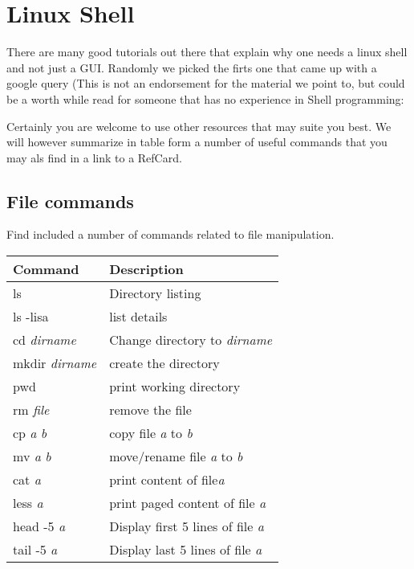 

\chapter{Linux Shell}
\label{C:linux-shell}

\FILENAME

There are many good tutorials out there that explain why one needs a
linux shell and not just a GUI. Randomly we picked the firts one that
came up with a google query (This is not an endorsement for the material
we point to, but could be a worth while read for someone that has no
experience in Shell programming:


Certainly you are welcome to use other resources that may suite you
best. We will however summarize in table form a number of useful
commands that you may als find in a link to a RefCard.



\section{File commands}\label{file-commands}

Find included a number of commands related to file manipulation.

\begin{tabular}{ll}
Command & Description \\
\hline
ls & Directory listing\\
ls -lisa & list details \\
cd \emph{dirname} & Change directory to \emph{dirname} \\
mkdir \emph{dirname} & create the directory \\
pwd & print working directory \\
rm \emph{file} & remove the file \\
cp \emph{a} \emph{b} & copy file \emph{a} to \emph{b} \\
mv \emph{a} \emph{b} & move/rename file \emph{a} to \emph{b}\\
cat \emph{a} & print content of file\emph{a}\\
less \emph{a} & print paged content of file \emph{a}\\
head -5 \emph{a} & Display first 5 lines of file \emph{a}\\
tail -5 \emph{a} & Display last 5 lines of file \emph{a}
\end{tabular}

